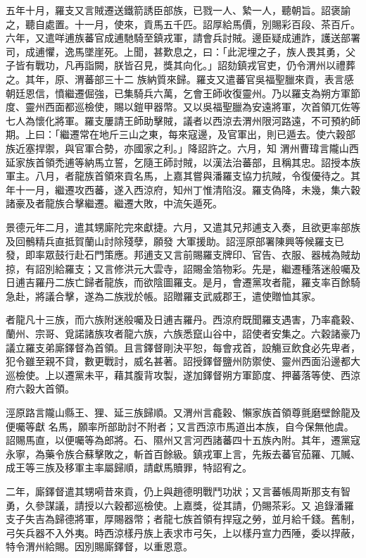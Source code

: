 \begin{pinyinscope}
 五年十月，羅支又言賊遷送鐵箭誘臣部族，已戮一人、縶一人，聽朝旨。詔褒諭之，聽自處置。十一月，使來，貢馬五千匹。詔厚給馬價，別賜彩百段、茶百斤。六年，又遣咩逋族蕃官成逋馳騎至鎮戎軍，請會兵討賊。邊臣疑成逋詐，護送部署司，成逋懼，逸馬墜崖死。上聞，甚歎息之，曰：「此泥埋之子，族人畏其勇，父子皆有戰功，凡再詣闕，朕皆召見，獎其向化。」詔劾鎮戎官吏，仍令渭州以禮葬之。其年，原、渭蕃部三十二
 族納質來歸。羅支又遣蕃官吳福聖臘來貢，表言感朝廷恩信，憤繼遷倔強，已集騎兵六萬，乞會王師收復靈州。乃以羅支為朔方軍節度、靈州西面都巡檢使，賜以鎧甲器幣。又以吳福聖臘為安遠將軍，次首領兀佐等七人為懷化將軍。羅支屢請王師助擊賊，議者以西涼去渭州限河路遠，不可預約師期。上曰：「繼遷常在地斤三山之東，每來寇邊，及官軍出，則已遁去。使六穀部族近塞捍禦，與官軍合勢，亦國家之利。」降詔許之。六月，知
 渭州曹瑋言隴山西延家族首領禿逋等納馬立誓，乞隨王師討賊，以漢法治蕃部，且稱其忠。詔授本族軍主。八月，者龍族首領來貢名馬，上嘉其嘗與潘羅支協力抗賊，令復優待之。其年十一月，繼遷攻西蕃，遂入西涼府，知州丁惟清陷沒。羅支偽降，未幾，集六穀諸豪及者龍族合擊繼遷。繼遷大敗，中流矢遁死。



 景德元年二月，遣其甥廝陀完來獻捷。六月，又遣其兄邦逋支入奏，且欲更率部族及回鶻精兵直抵賀蘭山討除殘孽，願發
 大軍援助。詔涇原部署陳興等候羅支已發，即率眾鼓行赴石門策應。邦逋支又言前賜羅支牌印、官告、衣服、器械為賊劫掠，有詔別給羅支；又言修洪元大雲寺，詔賜金箔物彩。先是，繼遷種落迷般囑及日逋吉羅丹二族亡歸者龍族，而欲陰圖羅支。是月，會遷黨攻者龍，羅支率百餘騎急赴，將議合擊，遂為二族戕於帳。詔贈羅支武威郡王，遣使贈恤其家。



 者龍凡十三族，而六族附迷般囑及日逋吉羅丹。西涼府既聞羅支遇害，乃率龕穀、
 蘭州、宗哥、覓諾諸族攻者龍六族，六族悉竄山谷中，詔使者安集之。六穀諸豪乃議立羅支弟廝鐸督為首領。且言鐸督剛決平恕，每會戎首，設觴豆飲食必先卑者，犯令雖至親不貸，數更戰討，威名甚著。詔授鐸督鹽州防禦使、靈州西面沿邊都大巡檢使。上以遷黨未平，藉其腹背攻製，遂加鐸督朔方軍節度、押蕃落等使、西涼府六穀大首領。



 涇原路言隴山縣王、狸、延三族歸順。又渭州言龕穀、懶家族首領尊氈磨壁餘龍及便囑等獻
 名馬，願率所部助討不附者；又言西涼市馬道出本族，自今保無他虞。詔賜馬直，以便囑等為郎將。石、隰州又言河西諸蕃四十五族內附。其年，遷黨寇永寧，為藥令族合蘇擊敗之，斬首百餘級。鎮戎軍上言，先叛去蕃官茄羅、兀贓、成王等三族及移軍主率屬歸順，請獻馬贖罪，特詔宥之。



 二年，廝鐸督遣其甥嗬昔來貢，仍上與趙德明戰鬥功狀；又言蕃帳周斯那支有智勇，久參謀議，請授以六穀都巡檢使。上嘉獎，從其請，仍賜茶彩。又
 追錄潘羅支子失吉為歸德將軍，厚賜器幣；者龍七族首領有捍寇之勞，並月給千錢。舊制，弓矢兵器不入外夷。時西涼樣丹族上表求市弓矢，上以樣丹宣力西陲，委以捍蔽，特令渭州給賜。因別賜廝鐸督，以重恩意。




\end{pinyinscope}
